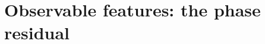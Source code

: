 \documentclass[../full_thesis/full_thesis.tex]{subfiles}
\begin{document}
%
%
%

\section{Observable features: the phase residual}
\label{sec: observable features: timing residuals}
\end{document}
